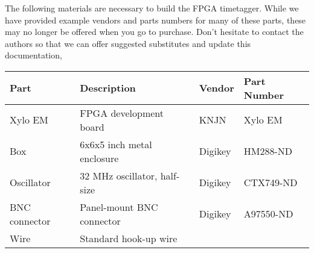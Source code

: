 The following materials are necessary to build the FPGA
timetagger. While we have provided example vendors and parts numbers
for many of these parts, these may no longer be offered when you go to
purchase. Don't hesitate to contact the authors so that we can offer
suggested substitutes and update this documentation,

\begin{table}
  \center
  \begin{tabular}{|l|l|ll|}
    \hline
    Part & Description & Vendor & Part Number \\
    \hline
    Xylo EM    & FPGA development board               & KNJN      & Xylo EM \\
    Box        & 6x6x5 inch metal enclosure           & Digikey   & HM288-ND \\
    Oscillator & 32 MHz oscillator, half-size         & Digikey   & CTX749-ND \\
    BNC connector & Panel-mount BNC connector         & Digikey   & A97550-ND \\
    Wire       & Standard hook-up wire                &           & \\
    \hline
  \end{tabular}
\end{table}


